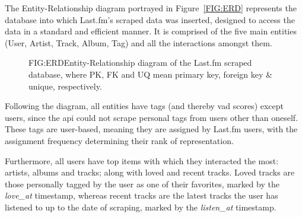 The Entity-Relationship diagram portrayed in Figure~\ref{FIG:ERD} represents the database into which Last.fm's scraped data was inserted, designed to access the data in a standard and efficient manner. It is comprised of the five main entities (User, Artist, Track, Album, Tag) and all the interactions amongst them.

\begin{figure}[Entity-Relationship diagram]{FIG:ERD}{Entity-Relationship diagram of the Last.fm scraped database, where PK, FK and UQ mean primary key, foreign key \& unique, respectively.}
\end{figure}

Following the diagram, all entities have tags (and thereby \acs{vad} scores) except users, since the \acs{api} could not scrape personal tags from users other than oneself. These tags are user-based, meaning they are assigned by Last.fm users, with the assignment frequency determining their rank of representation.

Furthermore, all users have top items with which they interacted the most: artists, albums and tracks; along with loved and recent tracks. Loved tracks are those personally tagged by the user as one of their favorites, marked by the \emph{love\_at} timestamp, whereas recent tracks are the latest tracks the user has listened to up to the date of scraping, marked by the \emph{listen\_at} timestamp.